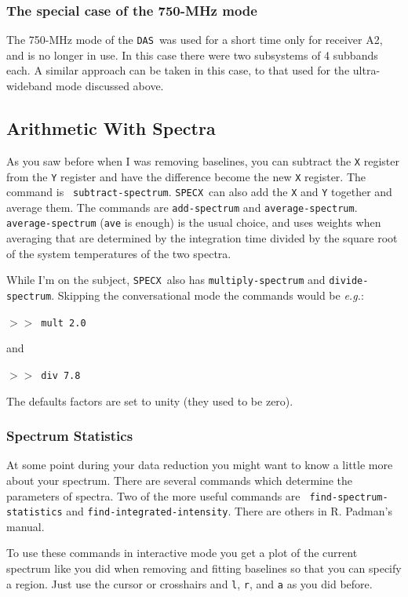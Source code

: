 \documentclass[11pt,twoside]{article}
\newcommand{\eg}{{\it e.g.}}
\newcommand{\SPECX}{{\tt SPECX}}
\newcommand{\das}{{\tt DAS}}
\newcommand{\SP}{{$>\!>$}}
\begin{document}
\subsubsection{The special case of the 750-MHz mode}
The 750-MHz mode of the \das\ was used for a short time only for
receiver A2, and is no longer in use. In this case there were two
subsystems of 4 subbands each. A similar approach can be taken in this
case, to that used for the ultra-wideband mode discussed above.

\subsection{Arithmetic With Spectra}
\label{sec:specx_8.1}

As you saw before when I was removing baselines, you can subtract the
{\tt X} register from the {\tt Y} register and have the difference
become the new {\tt X} register.  The command is {\tt
subtract-spectrum}.  \SPECX\ can also add the {\tt X} and {\tt Y}
together and average them.  The commands are {\tt add-spectrum} and
{\tt average-spectrum}.  {\tt average-spectrum} ({\tt{ave}} is enough)
is the usual choice, and uses weights when averaging that are
determined by the integration time divided by the square root of the
system temperatures of the two spectra.

While I'm on the subject, \SPECX\ also has {\tt multiply-spectrum} and
{\tt divide-spectrum}.  Skipping the conversational mode the commands
would be \eg :

\SP\ \verb|mult 2.0|

and

\SP\ \verb|div 7.8|

The defaults factors are set to unity (they used to be zero). 

\subsubsection{Spectrum Statistics}
\label{sec:specx_10}
At some point during your data reduction you might want to know a little more
about your spectrum.  There are several commands which determine the
parameters of spectra.  Two of the more useful commands are {\tt
find-spectrum-statistics} and {\tt find-integrated-intensity}.  There are
others in R. Padman's manual.

To use these commands in interactive mode you get a plot of the
current spectrum like you did when removing and fitting baselines so
that you can specify a region.  Just use the cursor or crosshairs and
{\tt l}, {\tt r}, and {\tt a} as you did before.
\end{document}
